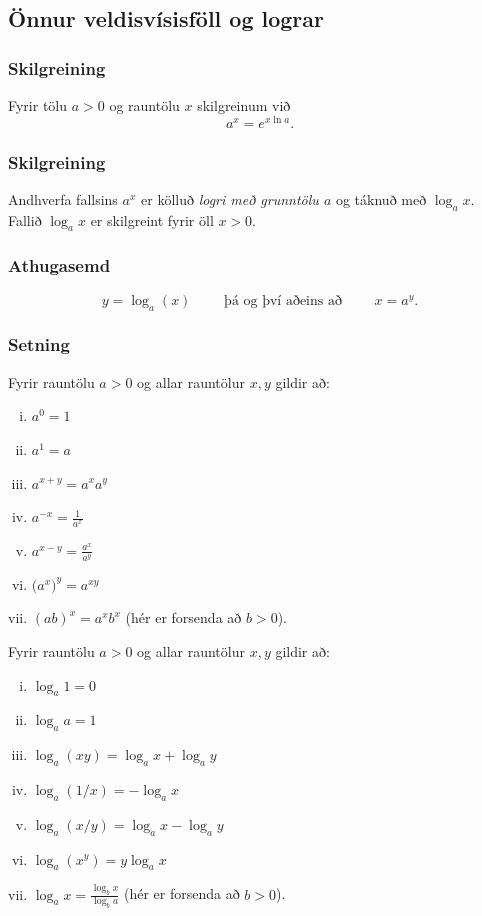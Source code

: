 \documentclass[icelandic,a4paper,12pt]{article}
\begin{document}
\subsection{Önnur veldisvísisföll og lograr}
\subsubsection{Skilgreining}
Fyrir tölu $a>0$ og rauntölu $x$ skilgreinum við 
$$a^x=e^{x\ln a}.$$

\subsubsection{Skilgreining}
Andhverfa fallsins $a^x$ er kölluð \emph{logri með grunntölu $a$} og
táknuð með $\log_a x$.  Fallið   $\log_a x$ er skilgreint fyrir öll
$x>0$.

\subsubsection{Athugasemd}
$$y
=\log_a(x)\qquad \text{ þá og því aðeins að } \qquad x = a^y.
$$

\subsubsection{Setning}
Fyrir rauntölu $a>0$ og allar rauntölur $x,y$ gildir að:

\begin{enumerate}[(i)]
\item $a^0=1$
\item $a^1=a$
\item $a^{x+y}=a^xa^y$
\item $a^{-x}=\frac{1}{a^x}$
\item $a^{x-y}=\frac{a^x}{a^y}$
\item $\big(a^x\big)^y=a^{xy}$
\item $(ab)^x=a^xb^x$ (hér er forsenda að $b>0$).
\end{enumerate}

Fyrir rauntölu $a>0$ og allar rauntölur $x,y$ gildir að:
\begin{enumerate}[(i)]
\item $\log_a 1=0$
\item $\log_a a = 1$
\item $\log_a(xy)=\log_a x+\log_a y$
\item $\log_a (1/x)=-\log_a x$
\item $\log_a (x/y)=\log_a x-\log_a y$
\item $\log_a (x^y)=y\log_a x$
\item $\log_a x=\frac{\log_b x}{\log_b a}$ (hér er forsenda að $b>0$).
\end{enumerate}
\end{document}
